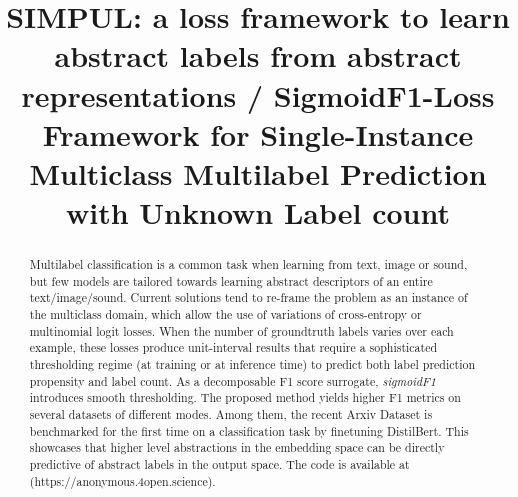 \documentclass[sigconf,natbib,screen=true,review=true,anonymous]{acmart}
\begin{document}
\title{SIMPUL: a loss framework to learn abstract labels from abstract representations / SigmoidF1-Loss Framework for Single-Instance Multiclass Multilabel Prediction with Unknown Label count}

\begin{abstract}
  Multilabel classification is a common task when learning from text, image or sound, but few models are tailored towards learning abstract descriptors of an entire text/image/sound. Current solutions tend to re-frame the problem as an instance of the multiclass domain, which allow the use of variations of cross-entropy or multinomial logit losses. When the number of groundtruth labels varies over each example, these losses produce unit-interval results that require a sophisticated thresholding regime (at training or at inference time) to predict both label prediction propensity and label count. As a decomposable F1 score surrogate, \emph{sigmoidF1} introduces smooth thresholding. The proposed method yields higher F1 metrics on several datasets of different modes. Among them, the recent Arxiv Dataset is benchmarked for the first time on a classification task by finetuning DistilBert. This showcases that higher level abstractions in the embedding space can be directly predictive of abstract labels in the output space. The code is available at (https://anonymous.4open.science). 
\end{abstract}



\maketitle

\acresetall









\end{document}
